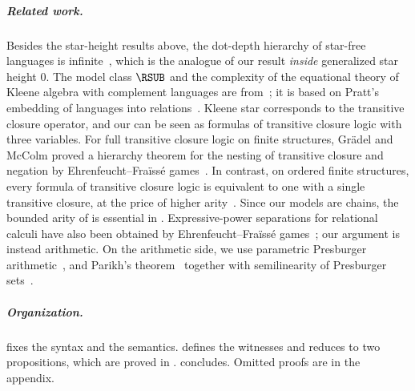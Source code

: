 \subparagraph*{Related work.}
Besides the star-height results above, the dot-depth hierarchy of star-free languages is infinite~\cite{brzozowskiDotdepthHierarchyStarfree1978,thomasConcatenationGameDotdepth1987},
which is the analogue of our result \emph{inside} generalized star height $0$.
The model class $\RSUB$ and the complexity of the equational theory of Kleene algebra with complement  languages are from~\cite{nakamuraFiniteRelationalSemantics2025}; it is based on Pratt's embedding of languages into relations~\cite{prattDynamicAlgebrasNature1980}.
Kleene star corresponds to the transitive closure operator, and our  can be seen as formulas of transitive closure logic with three variables.
For full transitive closure logic on finite structures, Gr\"adel and McColm proved a hierarchy theorem for the nesting of transitive closure and negation by Ehrenfeucht--Fra\"iss\'e games~\cite{gradelHierarchiesTransitiveClosure1996}.
In contrast, on ordered finite structures, every formula of transitive closure logic is equivalent to one with a single transitive closure, at the price of higher arity~\cite{immermanLanguagesThatCapture1987}.
Since our models are chains, the bounded arity of  is essential in .
Expressive-power separations for relational calculi have also been obtained by Ehrenfeucht--Fra\"iss\'e games~\cite{nakamuraExpressivePowerSuccinctness2022};
our argument is instead arithmetic.
On the arithmetic side, we use parametric Presburger arithmetic~\cite{bogartParametricPresburgerArithmetic2017},
and Parikh's theorem~\cite{parikhContextFreeLanguages1966} together with semilinearity of Presburger sets~\cite{ginsburgSemigroupsPresburgerFormulas1966}.

\subparagraph*{Organization.}
 fixes the syntax and the semantics.
 defines the witnesses and reduces  to two propositions, which are proved in .
 concludes.
Omitted proofs are in the appendix.
